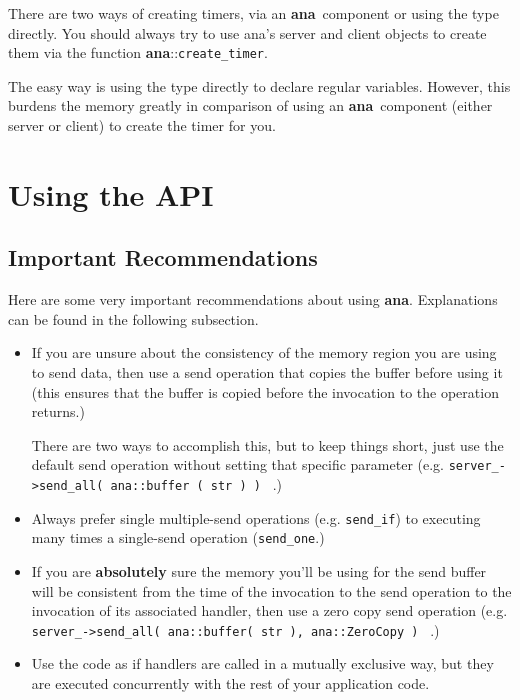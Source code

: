 \documentclass[a4paper,12pt,english]{article}
\newcommand{\ana}{\textbf{ana}}
\begin{document}
There are  two ways  of creating  timers, via an  \ana \  component or
using the type directly. You should always try to use ana's server and
client     objects    to    create     them    via     the    function
\ana::\texttt{create\_timer}.

The easy way is using  the type directly to declare regular variables.
However, this  burdens the  memory greatly in  comparison of  using an
\ana \  component (either  server or client)  to create the  timer for
you.

\section{Using the API}

\subsection{Important Recommendations}

Here   are   some   very   important   recommendations   about   using
\ana. Explanations can be found in the following subsection.

\begin{itemize}
   \item If you are unsure about the consistency of the memory region
     you are using to send data, then use a send operation that copies
     the buffer before using it (this ensures that the buffer is
     copied before the invocation to the operation returns.)
     
     There are two ways to  accomplish this, but to keep things short,
     just use the default send operation without setting that specific
     parameter (e.g. \texttt{server\_->send\_all(  ana::buffer ( str )
       ) } .)
   \item   Always  prefer   single   multiple-send  operations   (e.g.
     \texttt{send\_if})   to  executing   many  times   a  single-send
     operation (\texttt{send\_one}.)
   \item  If you  are \textbf{absolutely}  sure the  memory  you'll be
     using for the send buffer will be consistent from the time of the
     invocation  to  the  send  operation  to the  invocation  of  its
     associated  handler,   then  use  a  zero   copy  send  operation
     (e.g.    \texttt{server\_->send\_all(    ana::buffer(   str    ),
       ana::ZeroCopy ) } .)
   \item  Use  the  code as  if  handlers  are  called in  a  mutually
     exclusive way,  but they are executed concurrently  with the rest
     of your application code.
\end{itemize}
\end{document}
